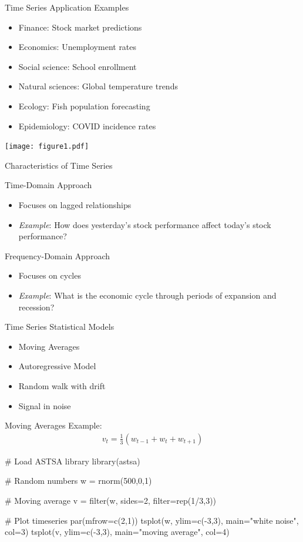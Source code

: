 \documentclass[ignorenonframetext,xcolor=x11names]{beamer}
\begin{document}
\begin{frame}{Time Series Application Examples}
\begin{itemize}
  \item Finance: Stock market predictions
  \item Economics: Unemployment rates
  \item Social science: School enrollment
  \item Natural sciences: Global temperature trends
  \item Ecology: Fish population forecasting
  \item Epidemiology: COVID incidence rates
\end{itemize}
\centering

\texttt{[image: figure1.pdf]}
\end{frame}


\begin{frame}{Characteristics of Time Series}
\begin{block}{Time-Domain Approach}
\begin{itemize}
  \item Focuses on lagged relationships
  \item \emph{Example}: How does yesterday's stock performance affect today's stock performance?
\end{itemize}
\end{block}

\begin{block}{Frequency-Domain Approach}
\begin{itemize}
  \item Focuses on cycles
  \item \emph{Example}: What is the economic cycle through periods of expansion and recession?
\end{itemize}
\end{block}
\end{frame}

\begin{frame}{Time Series Statistical Models}
\begin{itemize}
   \item Moving Averages
   \item Autoregressive Model
   \item Random walk with drift
   \item Signal in noise
\end{itemize}
\end{frame}

\begin{frame}[fragile]{Moving Averages}
Example:
\begin{align*}v_t = \frac{1}{3} ( w_{t-1} + w_t + w_{t+1})\end{align*}
\begin{Rcode}
# Load ASTSA library
library(astsa)

# Random numbers
w = rnorm(500,0,1)

# Moving average
v = filter(w, sides=2, filter=rep(1/3,3))

# Plot timeseries
par(mfrow=c(2,1))
tsplot(w, ylim=c(-3,3), main="white noise", col=3)
tsplot(v, ylim=c(-3,3), main="moving average", col=4)
\end{Rcode}
\end{frame}
\end{document}
